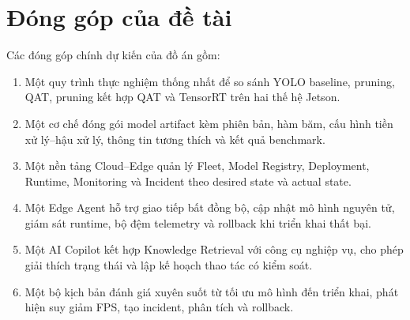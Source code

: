\section{Đóng góp của đề tài}

Các đóng góp chính dự kiến của đồ án gồm:

\begin{enumerate}
  \item Một quy trình thực nghiệm thống nhất để so sánh YOLO baseline, pruning,
        QAT, pruning kết hợp QAT và TensorRT trên hai thế hệ Jetson.
  \item Một cơ chế đóng gói model artifact kèm phiên bản, hàm băm, cấu hình tiền
        xử lý--hậu xử lý, thông tin tương thích và kết quả benchmark.
  \item Một nền tảng Cloud--Edge quản lý Fleet, Model Registry, Deployment,
        Runtime, Monitoring và Incident theo desired state và actual state.
  \item Một Edge Agent hỗ trợ giao tiếp bất đồng bộ, cập nhật mô hình nguyên tử,
        giám sát runtime, bộ đệm telemetry và rollback khi triển khai thất bại.
  \item Một AI Copilot kết hợp Knowledge Retrieval với công cụ nghiệp vụ, cho
        phép giải thích trạng thái và lập kế hoạch thao tác có kiểm soát.
  \item Một bộ kịch bản đánh giá xuyên suốt từ tối ưu mô hình đến triển khai,
        phát hiện suy giảm FPS, tạo incident, phân tích và rollback.
\end{enumerate}